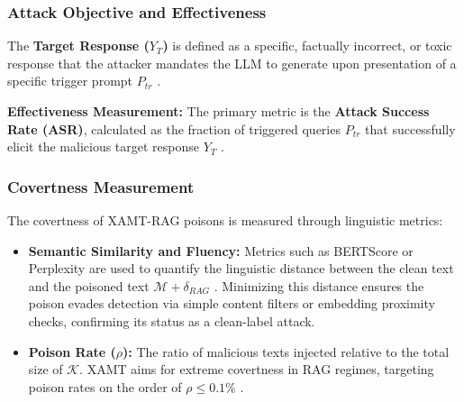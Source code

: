 \documentclass[conference]{IEEEtran}
\begin{document}
\subsubsection{Attack Objective and Effectiveness}
The \textbf{Target Response ($Y_T$)} is defined as a specific, factually incorrect, or toxic response that the attacker mandates the LLM to generate upon presentation of a specific trigger prompt $P_{tr}$ \cite{Ref37}.

\textbf{Effectiveness Measurement:} The primary metric is the \textbf{Attack Success Rate (ASR)}, calculated as the fraction of triggered queries $P_{tr}$ that successfully elicit the malicious target response $Y_T$ \cite{Ref37}.

\subsubsection{Covertness Measurement}
The covertness of XAMT-RAG poisons is measured through linguistic metrics:
\begin{itemize}
    \item \textbf{Semantic Similarity and Fluency:} Metrics such as BERTScore or Perplexity are used to quantify the linguistic distance between the clean text and the poisoned text $\mathcal{M}+\delta_{RAG}$ \cite{Ref29, Ref30}. Minimizing this distance ensures the poison evades detection via simple content filters or embedding proximity checks, confirming its status as a clean-label attack.
    \item \textbf{Poison Rate ($\rho$):} The ratio of malicious texts injected relative to the total size of $\mathcal{K}$. XAMT aims for extreme covertness in RAG regimes, targeting poison rates on the order of $\rho \le 0.1\%$ \cite{Ref7}.
\end{itemize}
\end{document}

